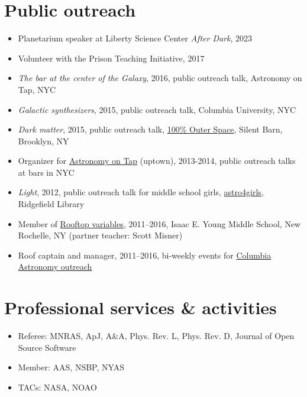 \documentclass[12pt, letterpaper]{apw-cv}
\begin{document}
\section*{Public outreach}

\begin{itemize}
    \item Planetarium speaker at Liberty Science Center \emph{After Dark}, 2023
    \item Volunteer with the Prison Teaching Initiative, 2017
    \item \emph{The bar at the center of the Galaxy}, 2016, public outreach talk, Astronomy on Tap, NYC
    \item \emph{Galactic synthesizers}, 2015, public outreach talk, Columbia University, NYC
    \item \emph{Dark matter}, 2015, public outreach talk, \href{http://silentbarn.org/2015/03/100-outer-space-party}{100\% Outer Space}, Silent Barn, Brooklyn, NY
    \item Organizer for \href{http://astronomyontap.org/}{Astronomy on Tap} (uptown), 2013-2014, public outreach talks at bars in NYC
    \item \emph{Light}, 2012, public outreach talk for middle school girls, \href{http://www.newstimes.com/news/article/Astronomer-Shoot-for-the-stars-3380793.php}{astro4girls}, Ridgefield Library
    \item Member of \href{http://rv.astro.columbia.edu}{Rooftop variables}, 2011--2016, Isaac E. Young Middle School, New Rochelle, NY (partner teacher: Scott Misner)
    \item Roof captain and manager, 2011--2016, bi-weekly events for \href{http://outreach.astro.columbia.edu/}{Columbia Astronomy outreach}
\end{itemize}

\section*{Professional services \& activities}

\begin{itemize}
	\item Referee: MNRAS, ApJ, A\&A, Phys. Rev. L, Phys. Rev. D, Journal of Open Source Software
	\item Member: AAS, NSBP, NYAS
    \item TACs: NASA, NOAO
\end{itemize}
\end{document}
